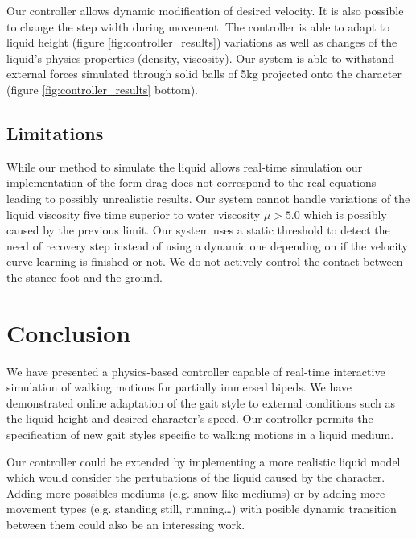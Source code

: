 \documentclass[conference]{acmsiggraph}
\begin{document}
Our controller allows dynamic modification of desired velocity. It is also possible to change the step width during movement. The controller is able to adapt to liquid height (figure \ref{fig:controller_results}) variations as well as changes of the liquid's physics properties (density, viscosity). Our system is able to withstand external forces simulated through solid balls of 5kg projected onto the character (figure \ref{fig:controller_results} bottom).

\subsection{Limitations}

While our method to simulate the liquid allows real-time simulation our implementation of the form drag does not correspond to the real equations leading to possibly unrealistic results. Our system cannot handle variations of the liquid viscosity five time superior to water viscosity $\mu>5.0$ which is possibly caused by the previous limit. Our system uses a static threshold to detect the need of recovery step instead of using a dynamic one depending on if the velocity curve learning is finished or not. We do not actively control the contact between the stance foot and the ground. 

\section{Conclusion}
\label{sec:conclusion}

We have presented a physics-based controller capable of real-time interactive simulation of walking motions for partially immersed bipeds. We have demonstrated online adaptation of the gait style to external conditions such as the liquid height and desired character's speed. Our controller permits the specification of new gait styles specific to walking motions in a liquid medium.

Our controller could be extended by implementing a more realistic liquid model which would consider the pertubations of the liquid caused by the character. Adding more possibles mediums (e.g. snow-like mediums) or by adding more movement types (e.g. standing still, running…) with posible dynamic transition between them could also be an interessing work.


\nocite{*}


\end{document}
